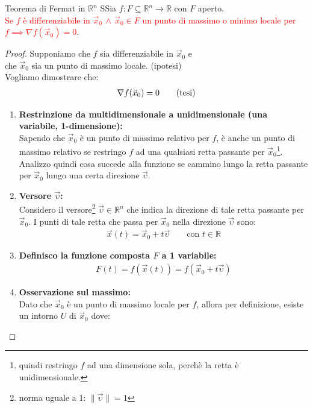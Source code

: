 \documentclass{article}  %
\begin{document}
\begin{theorem}{Teorema di Fermat in $\mathbb{R}^n$}
	SSia $f:F \subseteq \mathbb{R}^n \to \mathbb{R}$ con $F$ aperto. \\
	\textcolor{red}{Se $f$ è differenziabile in $\vec{x}_0 \, \land \, \vec{x}_0 \in F$ un punto di massimo o minimo locale per $f \implies \nabla f(\vec{x}_0)=0$}.
	\begin{proof}
		Supponiamo che $f$ sia differenziabile in $\vec{x}_0$ e  \\ che $\vec{x}_0$ sia un punto di massimo locale. \hfill(ipotesi) \\
		Vogliamo dimostrare che:
		\begin{align*}
			\nabla f(\vec{x}_0) = 0 \tag*{(\text{tesi})}
		\end{align*}
		\begin{enumerate}
			\item \textbf{Restrinzione da multidimensionale a unidimensionale (una variabile, 1-dimensione):} \\
			      Sapendo che $\vec{x}_0$ è un punto di massimo relativo per $f$, è anche un punto di massimo relativo se restringo $f$ ad una qualsiasi retta passante per $\vec{x}_0$\footnote{
				      quindi restringo $f$ ad una dimensione sola, perchè la retta è unidimensionale.
			      }. Analizzo quindi cosa succede alla funzione se cammino lungo la retta passante per $\vec{x}_0$ lungo una certa direzione $\vec{\upsilon}$.
			\item \textbf{Versore $\vec{\upsilon}$:} \\
			      Considero il versore\footnote{norma uguale a 1: $\|\vec{\upsilon}\| = 1$} $\vec{\upsilon} \in \mathbb{R}^n$ che indica la direzione di tale retta passante per $\vec{x}_0$.
			      I punti di tale retta che passa per $\vec{x}_0$ nella direzione $\vec{\upsilon}$ sono:
			      \begin{align*}
				      \vec{x}(t)=\vec{x}_0+t \vec{\upsilon} \quad \quad \text{con } t \in \mathbb{R}
			      \end{align*}
			\item \textbf{Definisco la funzione composta $F$ a 1 variabile:}
			      \begin{align*}
				      F(t)=f(\vec{x}(t)) = f(\vec{x}_0+t \vec{\upsilon})
			      \end{align*}
			\item \textbf{Osservazione sul massimo:} \\
			      Dato che $\vec{x}_0$ è un punto di massimo locale per $f$, allora per definizione, esiste un intorno $U$ di $\vec{x}_0$ dove:

\end{enumerate}
\end{proof}
\end{theorem}
\end{document}
